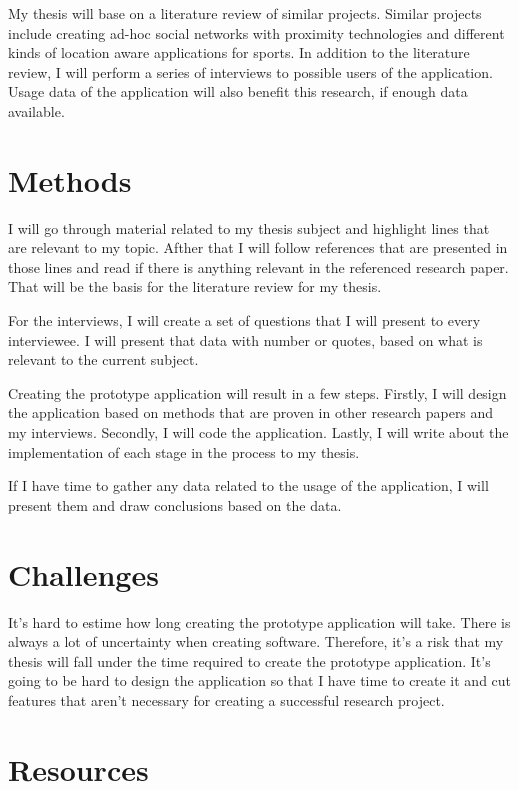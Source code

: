\documentclass[12pt,a4paper,finnish,oneside]{article}
\begin{document}
My thesis will base on a literature review of similar projects. Similar projects
include creating ad-hoc social networks with proximity technologies
and different kinds of location aware applications for sports. In addition
to the literature review, I will perform a series of interviews to possible
users of the application. Usage data of the application will also benefit
this research, if enough data available.

\section{Methods}

I will go through material related to my thesis subject and highlight
lines that are relevant to my topic. Afther that I will follow references
that are presented in those lines and read if there is anything relevant
in the referenced research paper. That will be the basis for the literature
review for my thesis.

For the interviews, I will create a set of questions that I will present to
every interviewee. I will present that data with number or quotes, based on
what is relevant to the current subject.

Creating the prototype application will result in a few steps. Firstly,
I will design the application based on methods that are proven in other research
papers and my interviews. Secondly, I will code the application. Lastly, I will
write about the implementation of each stage in the process to my thesis.

If I have time to gather any data related to the usage of the application,
I will present them and draw conclusions based on the data.


\section{Challenges}

It's hard to estime how long creating the prototype application will take.
There is always a lot of uncertainty when creating software. Therefore, it's
a risk that my thesis will fall under the time required to create the prototype
application. It's going to be hard to design the application so that I have
time to create it and cut features that aren't necessary for creating a
successful research project.

\section{Resources}
\end{document}
